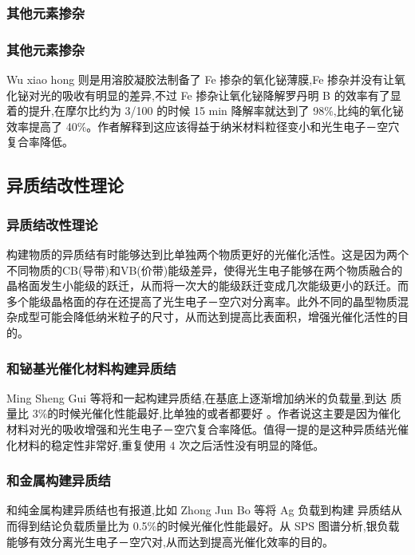 \documentclass[xetex,compress]{mybeamer}
\begin{document}
\subsubsection{其他元素掺杂}
\begin{frame}
\frametitle{其他元素掺杂}
\begin{block}{}
Wu xiao hong 则是用溶胶凝胶法制备了 Fe 掺杂的氧化铋薄膜,Fe 掺杂并没有让氧化铋对光的吸收有明显的差异,不过 Fe 掺杂让氧化铋降解罗丹明 B 的效率有了显着的提升,在摩尔比约为 3/100 的时候 15 min 降解率就达到了 98\%,比纯的氧化铋效率提高了 40\%。作者解释到这应该得益于纳米材料粒径变小和光生电子－空穴复合率降低。
\end{block}
\end{frame}

\subsection{异质结改性理论}
\begin{frame}
\frametitle{异质结改性理论}
\begin{block}{}
构建物质的异质结有时能够达到比单独两个物质更好的光催化活性。这是因为两个不同物质的CB(导带)和VB(价带)能级差异，使得光生电子能够在两个物质融合的晶格面发生小能级的跃迁，从而将一次大的能级跃迁变成几次能级更小的跃迁。而多个能级晶格面的存在还提高了光生电子－空穴对分离率。此外不同的晶型物质混杂成型可能会降低纳米粒子的尺寸，从而达到提高比表面积，增强光催化活性的目的。
\end{block}
\end{frame}

\begin{frame}
\frametitle{和铋基光催化材料构建异质结}
\begin{block}{}
Ming Sheng Gui 等将和一起构建异质结,在基底上逐渐增加纳米的负载量,到达
质量比 3\%的时候光催化性能最好,比单独的或者都要好 。作者说这主要是因为催化材料对光的吸收增强和光生电子－空穴复合率降低。值得一提的是这种异质结光催化材料的稳定性非常好,重复使用 4 次之后活性没有明显的降低。
\end{block}
\end{frame}

\begin{frame}
\frametitle{和金属构建异质结}
\begin{block}{}
和纯金属构建异质结也有报道,比如 Zhong Jun Bo 等将 Ag 负载到构建
异质结从而得到结论负载质量比为 0.5\%的时候光催化性能最好。从 SPS 图谱分析,银负载能够有效分离光生电子－空穴对,从而达到提高光催化效率的目的。
\end{block}
\end{frame}
\end{document}

